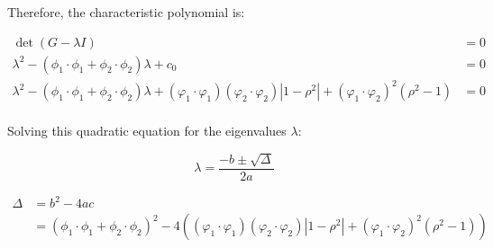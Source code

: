 \documentclass[11pt]{article}
\begin{document}
Therefore, the characteristic polynomial is:

\begin{align*}
\det (G - \lambda I) &= 0 \\
\lambda^2 - \left( \phi_1 \cdot \phi_1 + \phi_2 \cdot \phi_2 \right) \lambda + c_0 &= 0 \\
\lambda^2 - \left( \phi_1 \cdot \phi_1 + \phi_2 \cdot \phi_2 \right) \lambda + \left( \varphi_1\cdot\varphi_1 \right) \left( \varphi_2\cdot\varphi_2 \right) \left| 1 - \rho^2 \right| + \left( \varphi_1\cdot\varphi_2 \right)^2 \left( \rho^2 - 1 \right) &= 0 \\
\end{align*}

Solving this quadratic equation for the eigenvalues \(\lambda\):

\begin{equation*}
\lambda = \frac{-b \pm \sqrt{\Delta}}{2a}
\end{equation*}

\begin{align*}
\Delta &= b^2 - 4ac \\
  &= \left( \phi_1 \cdot \phi_1 + \phi_2 \cdot \phi_2 \right)^2 - 4 \left( \left( \varphi_1\cdot\varphi_1 \right) \left( \varphi_2\cdot\varphi_2 \right) \left| 1 - \rho^2 \right| + \left( \varphi_1\cdot\varphi_2 \right)^2 \left( \rho^2 - 1 \right) \right) \\
\end{align*}
\end{document}

